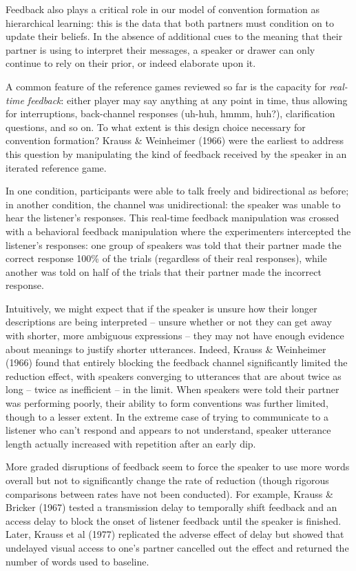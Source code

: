 \documentclass[11pt, floatsintext, man]{apa6}
\begin{document}
Feedback also plays a critical role in our model of convention formation as hierarchical learning: this is the data that both partners must condition on to update their beliefs. In the absence of additional cues to the meaning that their partner is using to interpret their messages, a speaker or drawer can only continue to rely on their prior, or indeed elaborate upon it.

A common feature of the reference games reviewed so far is the capacity for \emph{real-time feedback}: either player may say anything at any point in time, thus allowing for interruptions, back-channel responses (uh-huh, hmmm, huh?), clarification questions, and so on. To what extent is this design choice necessary for convention formation? Krauss \& Weinheimer (1966) were the earliest to address this question by manipulating the kind of feedback received by the speaker in an iterated reference game. 

In one condition, participants were able to talk freely and bidirectional as before; in another condition, the channel was unidirectional: the speaker was unable to hear the listener's responses. This real-time feedback manipulation was crossed with a behavioral feedback manipulation where the experimenters intercepted the listener's responses: one group of speakers was told that their partner made the correct response 100\% of the trials (regardless of their real responses), while another was told on half of the trials that their partner made the incorrect response. 

Intuitively, we might expect that if the speaker is unsure how their longer descriptions are being interpreted -- unsure whether or not they can get away with shorter, more ambiguous expressions -- they may not have enough evidence about meanings to justify shorter utterances. Indeed, Krauss \& Weinheimer (1966) found that entirely blocking the feedback channel significantly limited the reduction effect, with speakers converging to utterances that are about twice as long -- twice as inefficient -- in the limit. When speakers were told their partner was performing poorly, their ability to form conventions was further limited, though to a lesser extent. In the extreme case of trying to communicate to a listener who can't respond and appears to not understand, speaker utterance length actually increased with repetition after an early dip. 

More graded disruptions of feedback seem to force the speaker to use more words overall but not to significantly change the rate of reduction (though rigorous comparisons between rates have not been conducted). For example, Krauss \& Bricker (1967) tested a transmission delay to temporally shift feedback and an access delay to block the onset of listener feedback until the speaker is finished. Later, Krauss et al (1977) replicated the adverse effect of delay but showed that undelayed visual access to one's partner cancelled out the effect and returned the number of words used to baseline. 
\end{document}
